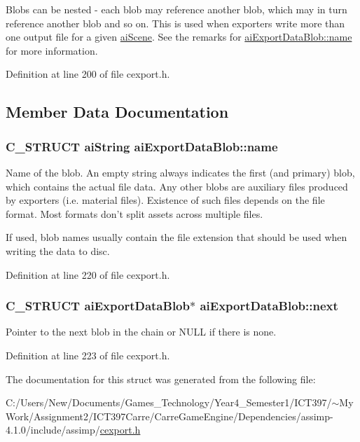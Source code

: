 Blobs can be nested - each blob may reference another blob, which may in turn reference another blob and so on. This is used when exporters write more than one output file for a given \hyperlink{structai_scene}{aiScene}. See the remarks for \hyperlink{structai_export_data_blob_f7f006ac5ad818c0d81d520a84f74c3e}{aiExportDataBlob::name} for more information. 

Definition at line 200 of file cexport.h.

\subsection{Member Data Documentation}
\hypertarget{structai_export_data_blob_f7f006ac5ad818c0d81d520a84f74c3e}{
\subsubsection[name]{\setlength{\rightskip}{0pt plus 5cm}C\_\-STRUCT {\bf aiString} {\bf aiExportDataBlob::name}}}
\label{structai_export_data_blob_f7f006ac5ad818c0d81d520a84f74c3e}


Name of the blob. An empty string always indicates the first (and primary) blob, which contains the actual file data. Any other blobs are auxiliary files produced by exporters (i.e. material files). Existence of such files depends on the file format. Most formats don't split assets across multiple files.

If used, blob names usually contain the file extension that should be used when writing the data to disc. 

Definition at line 220 of file cexport.h.\hypertarget{structai_export_data_blob_3e98fa760f45983ff1bccec6715f3817}{
\subsubsection[next]{\setlength{\rightskip}{0pt plus 5cm}C\_\-STRUCT {\bf aiExportDataBlob}$\ast$ {\bf aiExportDataBlob::next}}}
\label{structai_export_data_blob_3e98fa760f45983ff1bccec6715f3817}


Pointer to the next blob in the chain or NULL if there is none. 

Definition at line 223 of file cexport.h.

The documentation for this struct was generated from the following file:\begin{CompactItemize}
\item 
C:/Users/New/Documents/Games\_\-Technology/Year4\_\-Semester1/ICT397/$\sim$My Work/Assignment2/ICT397Carre/CarreGameEngine/Dependencies/assimp-4.1.0/include/assimp/\hyperlink{cexport_8h}{cexport.h}\end{CompactItemize}
